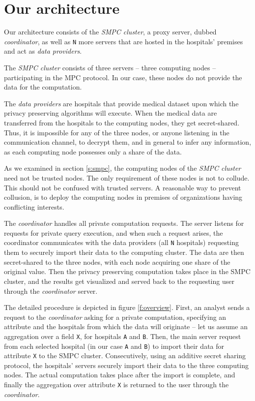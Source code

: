 
\section{Our architecture }\label{s:architecture}
Our architecture consists of the \textit{SMPC cluster}, a proxy server, dubbed \textit{coordinator}, as well as \texttt{N} more servers that are hosted in the hospitals' premises and act as \textit{data providers}.

The \textit{SMPC cluster} consists of three servers -- three computing nodes -- participating in the MPC protocol. In our case, these nodes do not provide the data for the computation.

The \textit{data providers} are hospitals that provide medical dataset upon which the privacy preserving algorithms will execute.
When the medical data are transferred from the hospitals to the computing nodes, they get secret\hyp shared.
Thus, it is impossible for any of the three nodes, or anyone listening in the communication channel, to decrypt them, and in general to infer any information, as each computing node possesses only a share of the data.

As we examined in section \ref{s:smpc}, the computing nodes of the \textit{SMPC cluster} need not be trusted nodes. The only requirement of these nodes is not to collude.
This should not be confused with trusted servers.
A reasonable way to prevent collusion, is to deploy the computing nodes in premises of organizations having conflicting interests.

The \textit{coordinator} handles all private computation requests.
The server listens for requests for private query execution, and when such a request arises, the coordinator communicates with the data providers (all \texttt{N} hospitals) requesting them to securely import their data to the computing cluster.
The data are then secret\hyp shared to the three nodes, with each node acquiring one share of the original value.
Then the privacy preserving computation takes place in the SMPC cluster, and the results get visualized and served back to the requesting user through the \textit{coordinator} server.


The detailed procedure is depicted in figure \ref{f:overview}.
First, an analyst sends a request to the \textit{coordinator} asking for a private computation, specifying an attribute and the hospitals from which the data will originate -- let us assume an aggregation over a field \texttt{X}, for hospitals \texttt{A} and \texttt{B}.
Then, the main server request from each selected hospital (in our case \texttt{A} and \texttt{B}) to import their data for attribute \texttt{X} to the SMPC cluster.
Consecutively, using an additive secret sharing protocol, the hospitals' servers securely import their data to the three computing nodes.
The actual computation takes place after the import is complete, and finally the aggregation over attribute \texttt{X} is returned to the user through the \textit{coordinator}.




